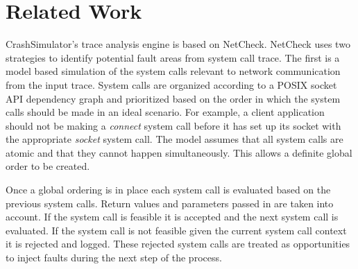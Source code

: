 \section{Related Work}

CrashSimulator's trace analysis engine is based on NetCheck. NetCheck uses two strategies
    to identify potential fault areas from system call trace. The first is a model based simulation of the system calls
    relevant to network communication from the input trace. System calls are organized according to a POSIX socket API
    dependency graph and prioritized based on the order in which the system calls should be made in an ideal scenario.
    For example, a client application should not be making a \emph{connect} system call before it has set up its
    socket with the appropriate \emph{socket} system call. The model assumes that all system calls are atomic and that
    they cannot happen simultaneously. This allows a definite global order to be created.

    Once a global ordering is in place each system call is evaluated based on the previous system calls. Return values
    and parameters passed in are taken into account. If the system call is feasible it is accepted and the next system
    call is evaluated. If the system call is not feasible given the current system call context it is rejected and
    logged. These rejected system calls are treated as opportunities to inject faults during the next step of the
    process.
